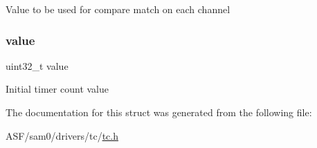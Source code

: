 Value to be used for compare match on each channel \mbox{\label{structtc__32bit__config_ae7f66047e6e39ba2bb6af8b95f00d1dd}} 
\subsubsection{\texorpdfstring{value}{value}}
{\footnotesize\ttfamily uint32\+\_\+t value}

Initial timer count value 

The documentation for this struct was generated from the following file\+:\begin{DoxyCompactItemize}
\item 
A\+S\+F/sam0/drivers/tc/\mbox{\hyperlink{drivers_2tc_2tc_8h}{tc.\+h}}\end{DoxyCompactItemize}
